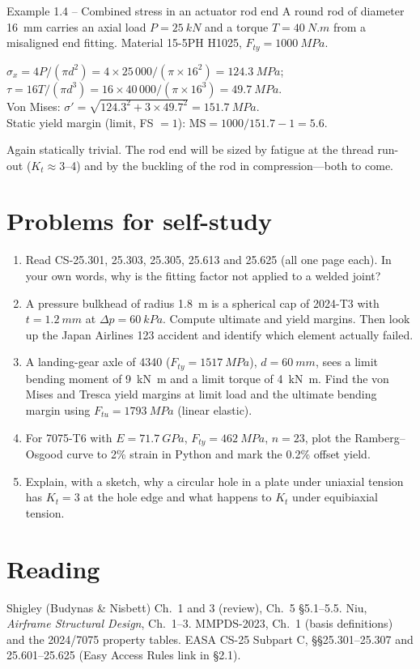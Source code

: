 \documentclass[11pt,a4paper]{article}
\begin{document}
\begin{examplebox}{Example 1.4 -- Combined stress in an actuator rod end}
A round rod of diameter \SI{16}{mm} carries an axial load $P = \SI{25}{kN}$ and a torque $T=\SI{40}{N.m}$ from a misaligned end fitting. Material 15-5PH H1025, $F_{ty}=\SI{1000}{MPa}$.

$\sigma_x = 4P/(\pi d^2) = 4\times25\,000/(\pi\times 16^2) = \SI{124.3}{MPa}$;\quad $\tau = 16T/(\pi d^3) = 16\times 40\,000/(\pi\times 16^3) = \SI{49.7}{MPa}$.\\
Von Mises: $\sigma' = \sqrt{124.3^2+3\times 49.7^2} = \SI{151.7}{MPa}$.\\
Static yield margin (limit, FS $=1$): $\mathrm{MS} = 1000/151.7 - 1 = 5.6$.

Again statically trivial. The rod end will be sized by fatigue at the thread run-out ($K_t\approx 3$--4) and by the buckling of the rod in compression---both to come.
\end{examplebox}

\section{Problems for self-study}
\begin{enumerate}[nosep]
  \item Read CS-25.301, 25.303, 25.305, 25.613 and 25.625 (all one page each). In your own words, why is the fitting factor not applied to a welded joint?
  \item A pressure bulkhead of radius \SI{1.8}{m} is a spherical cap of 2024-T3 with $t=\SI{1.2}{mm}$ at $\Delta p=\SI{60}{kPa}$. Compute ultimate and yield margins. Then look up the Japan Airlines 123 accident and identify which element actually failed.
  \item A landing-gear axle of 4340 ($F_{ty}=\SI{1517}{MPa}$), $d=\SI{60}{mm}$, sees a limit bending moment of \SI{9}{kN.m} and a limit torque of \SI{4}{kN.m}. Find the von Mises and Tresca yield margins at limit load and the ultimate bending margin using $F_{tu}=\SI{1793}{MPa}$ (linear elastic).
  \item For 7075-T6 with $E=\SI{71.7}{GPa}$, $F_{ty}=\SI{462}{MPa}$, $n=23$, plot the Ramberg--Osgood curve to 2\% strain in Python and mark the 0.2\% offset yield.
  \item Explain, with a sketch, why a circular hole in a plate under uniaxial tension has $K_t=3$ at the hole edge and what happens to $K_t$ under equibiaxial tension.
\end{enumerate}

\section*{Reading}
Shigley (Budynas \& Nisbett) Ch.\ 1 and 3 (review), Ch.\ 5 \S5.1--5.5. Niu, \emph{Airframe Structural Design}, Ch.\ 1--3. MMPDS-2023, Ch.\ 1 (basis definitions) and the 2024/7075 property tables. EASA CS-25 Subpart C, \S\S 25.301--25.307 and 25.601--25.625 (Easy Access Rules link in \S2.1).
\end{document}
